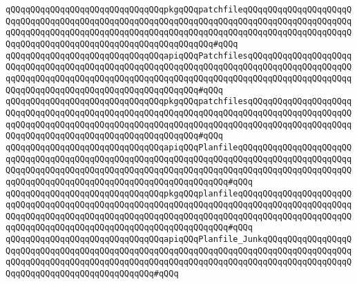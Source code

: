 \verb|qQQqqQQqqQQqqQQqqQQqqQQqqQQqqQQqpkgqQQqpatchfileqQQqqQQqqQQqqQQqqQQqqQQqqQQqqQQqqQQqqQQqqQQqqQQqqQQqqQQqqQQqqQQqqQQqqQQqqQQqqQQqqQQqqQQqqQQqqQQqqQQqqQQqqQQqqQQqqQQqqQQqqQQqqQQqqQQqqQQqqQQqqQQqqQQqqQQqqQQqqQQqqQQqqQQqqQQqqQQqqQQqqQQqqQQqqQQqqQQqqQQqqQQq#qQQq|\newline
\newline
\verb|qQQqqQQqqQQqqQQqqQQqqQQqqQQqqQQqapiqQQqPatchfilesqQQqqQQqqQQqqQQqqQQqqQQqqQQqqQQqqQQqqQQqqQQqqQQqqQQqqQQqqQQqqQQqqQQqqQQqqQQqqQQqqQQqqQQqqQQqqQQqqQQqqQQqqQQqqQQqqQQqqQQqqQQqqQQqqQQqqQQqqQQqqQQqqQQqqQQqqQQqqQQqqQQqqQQqqQQqqQQqqQQqqQQqqQQqqQQqqQQqqQQq#qQQq|\newline
\verb|qQQqqQQqqQQqqQQqqQQqqQQqqQQqqQQqpkgqQQqpatchfilesqQQqqQQqqQQqqQQqqQQqqQQqqQQqqQQqqQQqqQQqqQQqqQQqqQQqqQQqqQQqqQQqqQQqqQQqqQQqqQQqqQQqqQQqqQQqqQQqqQQqqQQqqQQqqQQqqQQqqQQqqQQqqQQqqQQqqQQqqQQqqQQqqQQqqQQqqQQqqQQqqQQqqQQqqQQqqQQqqQQqqQQqqQQqqQQqqQQqqQQq#qQQq|\newline
\newline
\verb|qQQqqQQqqQQqqQQqqQQqqQQqqQQqqQQqapiqQQqPlanfileqQQqqQQqqQQqqQQqqQQqqQQqqQQqqQQqqQQqqQQqqQQqqQQqqQQqqQQqqQQqqQQqqQQqqQQqqQQqqQQqqQQqqQQqqQQqqQQqqQQqqQQqqQQqqQQqqQQqqQQqqQQqqQQqqQQqqQQqqQQqqQQqqQQqqQQqqQQqqQQqqQQqqQQqqQQqqQQqqQQqqQQqqQQqqQQqqQQqqQQqqQQqqQQq#qQQq|\newline
\verb|qQQqqQQqqQQqqQQqqQQqqQQqqQQqqQQqpkgqQQqplanfileqQQqqQQqqQQqqQQqqQQqqQQqqQQqqQQqqQQqqQQqqQQqqQQqqQQqqQQqqQQqqQQqqQQqqQQqqQQqqQQqqQQqqQQqqQQqqQQqqQQqqQQqqQQqqQQqqQQqqQQqqQQqqQQqqQQqqQQqqQQqqQQqqQQqqQQqqQQqqQQqqQQqqQQqqQQqqQQqqQQqqQQqqQQqqQQqqQQqqQQqqQQqqQQq#qQQq|\newline
\newline
\verb|qQQqqQQqqQQqqQQqqQQqqQQqqQQqqQQqapiqQQqPlanfile_JunkqQQqqQQqqQQqqQQqqQQqqQQqqQQqqQQqqQQqqQQqqQQqqQQqqQQqqQQqqQQqqQQqqQQqqQQqqQQqqQQqqQQqqQQqqQQqqQQqqQQqqQQqqQQqqQQqqQQqqQQqqQQqqQQqqQQqqQQqqQQqqQQqqQQqqQQqqQQqqQQqqQQqqQQqqQQqqQQqqQQqqQQqqQQq#qQQq|\newline
